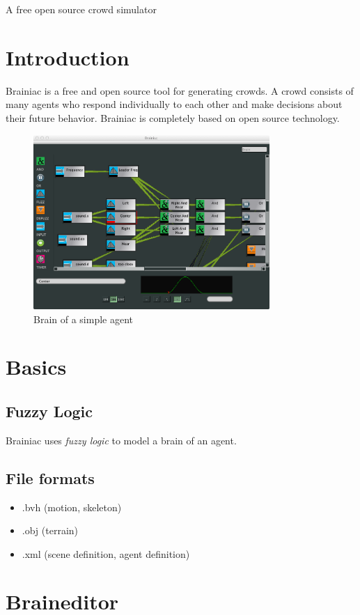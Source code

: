 \documentclass{scrartcl}
\begin{document}
A free open source crowd simulator

\section{Introduction}

Brainiac is a free and open source tool for generating crowds.
A crowd consists of many agents who respond individually to each other and make decisions about their future behavior.
Brainiac is completely based on open source technology.

\begin{figure}[h]
\centering
\includegraphics[width=0.8\textwidth]{pics/BrainExampleBig.png}
\caption{Brain of a simple agent}
\end{figure}


\section{Basics}
\subsection{Fuzzy Logic}
Brainiac uses \textit{fuzzy logic} to model a brain of an agent.
\subsection{File formats}
  \begin{itemize}
    \item .bvh (motion, skeleton)
    \item .obj (terrain)
    \item .xml (scene definition, agent definition)
  \end{itemize}

\section{Braineditor}
\end{document}
